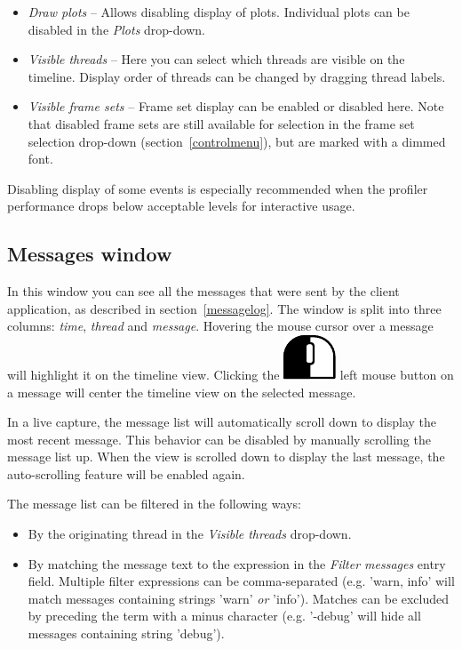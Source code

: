 \documentclass[hidelinks,titlepage,a4paper]{article}
\newcommand{\LMB}{\includegraphics[height=.8\baselineskip]{icons/lmb}}
\begin{document}
\begin{itemize}
\item \emph{\faSignature{} Draw plots} -- Allows disabling display of plots. Individual plots can be disabled in the \emph{Plots} drop-down.
\item \emph{\faRandom{} Visible threads} -- Here you can select which threads are visible on the timeline. Display order of threads can be changed by dragging thread labels.
\item \emph{\faImages{} Visible frame sets} -- Frame set display can be enabled or disabled here. Note that disabled frame sets are still available for selection in the frame set selection drop-down (section~\ref{controlmenu}), but are marked with a dimmed font.
\end{itemize}

Disabling display of some events is especially recommended when the profiler performance drops below acceptable levels for interactive usage.

\subsection{Messages window}
\label{messages}

In this window you can see all the messages that were sent by the client application, as described in section~\ref{messagelog}. The window is split into three columns: \emph{time}, \emph{thread} and \emph{message}. Hovering the \faMousePointer{} mouse cursor over a message will highlight it on the timeline view. Clicking the \LMB{} left mouse button on a message will center the timeline view on the selected message.

In a live capture, the message list will automatically scroll down to display the most recent message. This behavior can be disabled by manually scrolling the message list up. When the view is scrolled down to display the last message, the auto-scrolling feature will be enabled again.

The message list can be filtered in the following ways:

\begin{itemize}
\item By the originating thread in the \emph{\faRandom{} Visible threads} drop-down.
\item By matching the message text to the expression in the \emph{Filter messages} entry field. Multiple filter expressions can be comma-separated (e.g. 'warn, info' will match messages containing strings 'warn' \emph{or} 'info'). Matches can be excluded by preceding the term with a minus character (e.g. '-debug' will hide all messages containing string 'debug').
\end{itemize}
\end{document}

